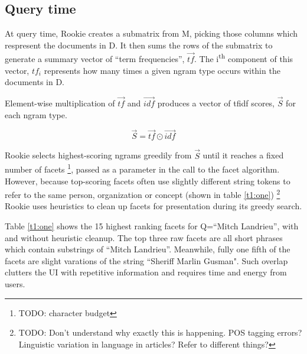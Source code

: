 \documentclass{article}
\begin{document}
\subsection{Query time}

At query time, Rookie creates a submatrix from M, picking those columns which respresent the documents in D. It then sums the rows of the submatrix to generate a summary vector of ``term frequencies'', $\vec{tf}$. The i\textsuperscript{th} component of this vector, $tf_{i}$ represents how many times a given ngram type occurs within the documents in D. 

Element-wise multiplication of $\vec{tf}$ and $\vec{idf}$ produces a vector of tfidf scores, $\vec{S}$  for each ngram type.

\begin{equation}
\vec{S} = \vec{tf} \odot \vec{idf}
\end{equation}

Rookie selects highest-scoring ngrams greedily from $\vec{S}$ until it reaches a fixed number of facets \footnote{TODO: character budget}, passed as a parameter in the call to the facet algorithm. However, because top-scoring facets often use slightly different string tokens to refer to the same person, organization or concept (shown in table \ref{t1:one}) \footnote{TODO: Don't understand why exactly this is happening. POS tagging errors? Linguistic variation in language in articles? Refer to different things?}
Rookie uses heuristics to clean up facets for presentation during its greedy search.

Table \ref{t1:one} shows the 15 highest ranking facets for Q=``Mitch Landrieu'', with and without heuristic cleanup. The top three raw facets are all short phrases which contain substrings of ``Mitch Landrieu''. Meanwhile, fully one fifth of the facets are slight varations of the string ``Sheriff Marlin Gusman". Such overlap clutters the UI with repetitive information and requires time and energy from users.
\end{document}

